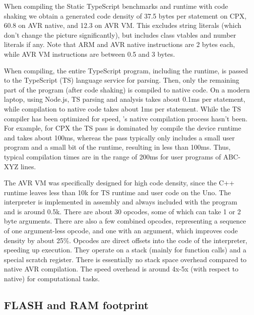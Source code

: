 When compiling the Static TypeScript benchmarks and runtime with code shaking we obtain 
a generated code density of 37.5 bytes per statement on CPX, 60.8 on AVR native, and 12.3 on AVR VM.
This excludes string literals (which don't change the picture significantly), but includes class 
vtables and number literals if any. Note that ARM and AVR native instructions are 2 bytes each,
while AVR VM instructions are between 0.5 and 3 bytes.

When compiling, the entire TypeScript program, including the runtime, is
passed to the TypeScript (TS) language service for parsing. Then, only the remaining
part of the program (after code shaking) is compiled to native code.
On a modern laptop, using Node.js, TS parsing and analysis takes about 0.1ms per statement,
while \MC compilation to native code takes about 1ms per statement.
While the TS compiler has been optimized for speed, 
\MCN's native compilation process hasn't been.
For example, for CPX the TS pass is dominated by compile the device runtime 
and takes about 100ms, whereas the \MC pass typically only includes a small user program
and a small bit of the runtime, resulting in less than 100ms. 
Thus, typical compilation times are in the range of 200ms for user programs
of ABC-XYZ lines. 

The AVR VM was specifically designed for high code density, since the C++ runtime
leaves less than 10k for TS runtime and user code on the Uno.
The interpreter is implemented in assembly and always included with the program and is around 0.5k.
There are about 30 opcodes, some of which can take 1 or 2 byte arguments. 
There are also a few combined opcodes, representing a sequence of one argument-less opcode,
and one with an argument, which improves code density by about 25\%.
Opcodes are direct offsets into the code of the interpreter, speeding up execution.
They operate on a stack (mainly for function calls) and a special scratch register.
There is essentially no stack space overhead compared to native AVR compilation.
The speed overhead is around 4x-5x (with respect to native) for computational tasks.



\subsection{FLASH and RAM footprint}

